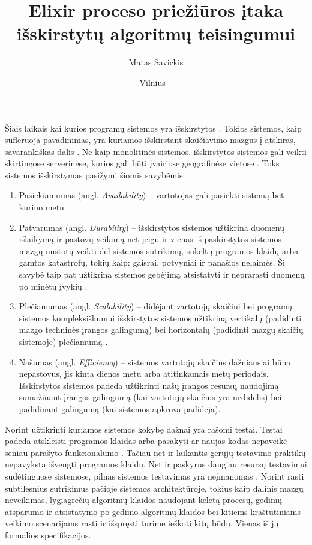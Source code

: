 \documentclass{VUMIFPSmagistrinis}
\title{Elixir proceso priežiūros įtaka išskirstytų algoritmų teisingumui}
\author{Matas Savickis}
\date{Vilnius – \the\year}
\begin{document}

\maketitle

\tableofcontents



		Šiais laikais kai kurios programų sistemos yra išskirstytos \cite{mcr}. 
		Tokios sistemos, kaip sufleruoja pavadinimas, yra kuriamos išskirstant skaičiavimo mazgus į atskiras, savarankiškas dalis \cite{coulouris2005distributed}.
		Ne kaip monolitinės sistemos, išskirstytos sistemos gali veikti skirtingose serverinėse, kurios gali būti įvairiose geografinėse vietose \cite{shirriff2006method}.
		Toks sistemos išskirstymas pasižymi šiomis savybėmis:

		\begin{enumerate}
			\item{Pasiekiamumas (angl. {\it Availability}) -- vartotojas gali pasiekti sistemą bet kuriuo metu \cite{180327}.}
			\item{Patvarumas (angl. {\it Durability}) -- išskirstytos sistemos užtikrina duomenų išlaikymą ir pastovų veikimą net jeigu ir vienas iš paskirstytos sistemos mazgų nustotų veikti dėl sistemos sutrikimų, sukeltų programos klaidų arba gamtos katastrofų, tokių kaip: gaisrai, potvyniai ir panašios nelaimės. Ši savybė taip pat užtikrina sistemos gebėjimą atsistatyti ir neprarasti duomenų po minėtų įvykių \cite{5470366}.}
			\item{Plečiamumas (angl. {\it Scalability}) -- didėjant vartotojų skaičiui bei programų sistemos kompleksiškumui išskirstytos sistemos užtikriną vertikalų (padidinti mazgo techninės įrangos galingumą) bei horizontalų (padidinti mazgų skaičių sistemoje) plečiamumą \cite{862209}.}
			\item{Našumas (angl. {\it Efficiency}) -- sistemos vartotojų skaičius dažniausiai būna nepastovus, jis kinta dienos metu arba atitinkamais metų periodais. Išskirstytos sistemos padeda užtikrinti našų įrangos resursų naudojimą sumažinant įrangos galingumą (kai vartotojų skaičius yra nedidelis) bei padidinant galingumą (kai sistemos apkrova padidėja).}
		\end{enumerate}

		Norint užtikrinti kuriamos sistemos kokybę dažnai yra rašomi testai. 
		Testai padeda atskleisti programos klaidas arba pasakyti ar naujas kodas nepaveikė seniau parašyto funkcionalumo \cite{819971}.
		Tačiau net ir laikantis gerųjų testavimo praktikų nepavyksta išvengti programos klaidų.
		Net ir paskyrus daugiau resursų testavimui sudėtinguose sistemose, pilnas sistemos testavimas yra neįmanomas \cite{sullivan2004software}.
		Norint rasti subtilesnius sutrikimus pačioje sistemos architektūroje, tokius kaip dalinis mazgų neveikimas, lygiagrečių algoritmų klaidos naudojant keletą procesų, gedimų atsparumo ir atsistatymo po gedimo algoritmų klaidos bei kitiems kraštutiniams veikimo scenarijams \cite{newcombe2014use} rasti ir išspręsti turime ieškoti kitų būdų. 
		Vienas iš jų formalios specifikacijos.
\end{document}
